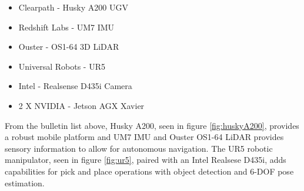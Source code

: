 \begin{itemize}
    \item Clearpath - Husky A200 UGV
    \item Redshift Labs - UM7 IMU
    \item Ouster -  OS1-64 3D LiDAR
    \item Universal Robots - UR5
    \item Intel - Realsense D435i Camera
    \item 2 X NVIDIA - Jetson AGX Xavier
\end{itemize}

From the bulletin list above, Husky A200, seen in figure \ref{fig:huskyA200}, provides a robust mobile platform and UM7 IMU and Ouster OS1-64 LiDAR provides sensory information to allow for autonomous navigation. The UR5 robotic manipulator, seen in figure \ref{fig:ur5}, paired with an Intel Realsese D435i, adds capabilities for pick and place operations with object detection and 6-DOF pose estimation.


